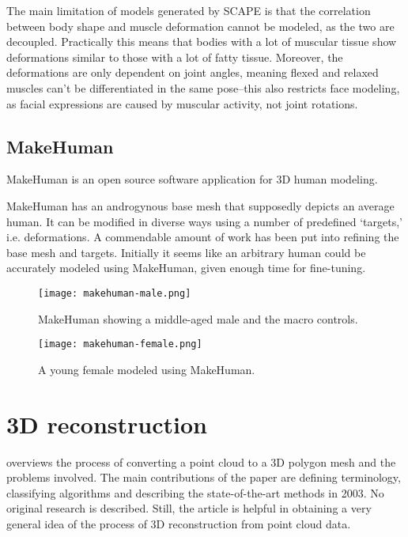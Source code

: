 The main limitation of models generated by SCAPE is that the correlation between body shape and muscle deformation cannot be modeled, as the two are decoupled. Practically this means that bodies with a lot of muscular tissue show deformations similar to those with a lot of fatty tissue. Moreover, the deformations are only dependent on joint angles, meaning flexed and relaxed muscles can't be differentiated in the same pose--this also restricts face modeling, as facial expressions are caused by muscular activity, not joint rotations. \citep{anguelov2005scape}



\subsection{MakeHuman}

MakeHuman \citep{makehuman} is an open source software application for 3D human modeling.

MakeHuman has an androgynous base mesh that supposedly depicts an average human. It can be modified in diverse ways using a number of predefined `targets,' i.e. deformations. A commendable amount of work has been put into refining the base mesh and targets. Initially it seems like an arbitrary human could be accurately modeled using MakeHuman, given enough time for fine-tuning.

\begin{figure}
    \centering
    \texttt{[image: makehuman-male.png]}
    \caption{MakeHuman showing a middle-aged male and the macro controls.}
    \label{fig:makehuman-male}
\end{figure}

\begin{figure}
    \centering
    \texttt{[image: makehuman-female.png]}
    \caption{A young female modeled using MakeHuman.}
    \label{fig:makehuman-female}
\end{figure}


\section{3D reconstruction}

\citet{fabio2003point} overviews the process of converting a point cloud to a 3D polygon mesh and the problems involved. The main contributions of the paper are defining terminology, classifying algorithms and describing the state-of-the-art methods in 2003. No original research is described. Still, the article is helpful in obtaining a very general idea of the process of 3D reconstruction from point cloud data.

